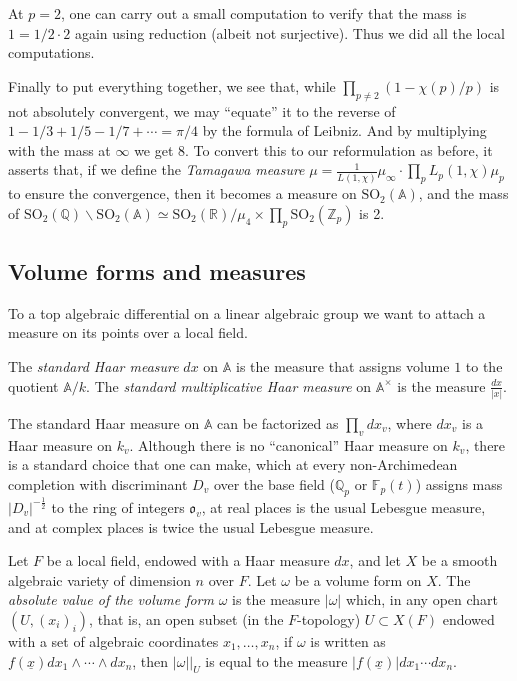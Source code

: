 	
	At $p=2$, one can carry out a small computation to verify that the mass is $1 = 1/2\cdot 2$ again using reduction (albeit not surjective). Thus we did all the local computations. 
	
	Finally to put everything together, we see that, while $\prod_{p\ne 2}(1-\chi(p)/p)$ is not absolutely convergent, we may ``equate'' it to the reverse of $1-1/3+1/5-1/7+\cdots = \pi/4$ by the formula of Leibniz. And by multiplying with the mass at $\infty$ we get $8$. To convert this to our reformulation as before, it asserts that, if we define the \textit{Tamagawa measure} $\mu = \frac{1}{L(1,\chi)}\mu_\infty\cdot \prod_p L_p(1,\chi)\mu_p$ to ensure the convergence, then it becomes a measure on $\mathrm{SO}_2(\mathbb{A})$, and the mass of $\mathrm{SO}_2(\mathbb{Q})\backslash \mathrm{SO}_2(\mathbb{A})\simeq \mathrm{SO}_2(\mathbb{R})/\mu_4 \times \prod_p \mathrm{SO}_2(\mathbb{Z}_p)$ is 2.
	
\subsection{Volume forms and measures}
\label{subsection-measures}
	
	To a top algebraic differential on a linear algebraic group we want to attach a measure on its points over a local field.  
	
\begin{definition}
 \label{definition-standard-Haar}
The {\it standard Haar measure} $dx$ on $\mathbb A$ is the measure that assigns volume $1$ to the quotient $\mathbb A/k$. The {\it standard multiplicative Haar measure} on $\mathbb A^\times$ is the measure $\frac{dx}{|x|}$. 
\end{definition}

\begin{remark}
 \label{remark-local-measures}
The standard Haar measure on $\mathbb A$ can be factorized as $\prod_v dx_v$, where $dx_v$ is a Haar measure on $k_v$. Although there is no ``canonical'' Haar measure on $k_v$, there is a standard choice that one can make, which at every non-Archimedean completion with discriminant $D_v$ over the base field ($\mathbb Q_p$ or $\mathbb F_p(t)$) assigns mass $|D_v|^{-\frac{1}{2}}$ to the ring of integers $\mathfrak o_v$, at real places is the usual Lebesgue measure, and at complex places is twice the usual Lebesgue measure.
\end{remark}



\begin{definition}
 \label{definition-absolute-value-measure}
Let $F$ be a local field, endowed with a Haar measure $dx$, and let $X$ be a smooth algebraic variety of dimension $n$ over $F$. Let $\omega$ be a volume form on $X$. The {\it absolute value of the volume form} $\omega$ is the measure $|\omega|$ which, in any open chart $(U ,(x_i)_i)$, that is, an open subset (in the $F$-topology) $U\subset X(F)$ endowed with a set of algebraic coordinates $x_1, \dots, x_n$, if $\omega$ is written as $f(\underline x) dx_1 \wedge \cdots \wedge dx_n$, then $\left. |\omega| \right|_{U}$ is equal to the measure $|f(\underline x)| dx_1 \cdots dx_n$.
\end{definition}

